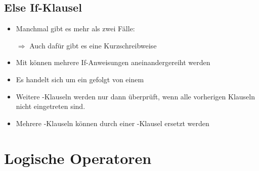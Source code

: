 \subsection{Else If-Klausel}

\begin{frame}
    \slidehead
    \begin{itemize}
        \item Manchmal gibt es mehr als zwei Fälle:
        \item[$\Rightarrow$] Auch dafür gibt es eine Kurzschreibweise
    \end{itemize}
\end{frame}

\begin{frame}
    \slidehead

    \begin{itemize}
        \item Mit  können mehrere If-Anweisungen aneinandergereiht werden
        \item Es handelt sich um ein  gefolgt von einem 
        \item Weitere -Klauseln werden nur dann überprüft, wenn alle vorherigen Klauseln nicht eingetreten sind.
    \end{itemize}
\end{frame}

\livecoding

\begin{frame}
    \slidehead
    \begin{itemize}
        \item Mehrere -Klauseln können durch einer -Klausel ersetzt werden
    \end{itemize}
\end{frame}

\livecoding


\section{Logische Operatoren}

